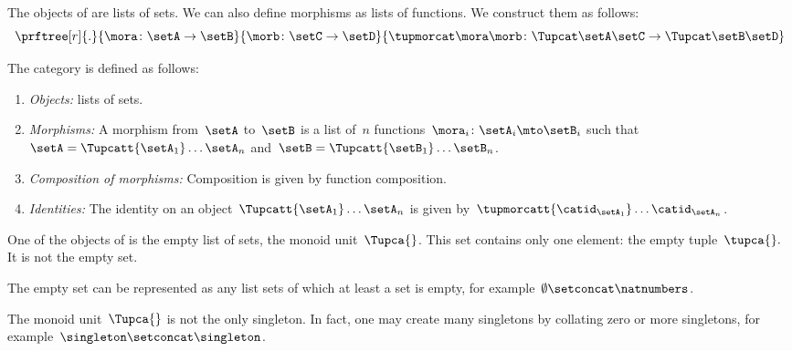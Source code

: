 The objects of \SetStar are lists of sets.
We can also define morphisms as lists of functions.
We construct them as follows:
%
\begin{equation}
    \label{eq:sets-monoid-maps2}
    \prftree[r]{.}{ 
        \mora \colon \setA \to \setB
    }{ 
        \morb \colon \setC \to \setD
    }{ 
        \tupmorcat \mora \morb \colon \Tupcat \setA   \setC \to \Tupcat \setB  \setD
    }
\end{equation}
%
\begin{definition}
    The category \SetStar is defined as follows: 
    \begin{enumerate}
        \item \emph{Objects:} lists of sets.
        \item \emph{Morphisms:} A morphism from~$\setA$ to~$\setB$ is a list of~$n$ functions~$\mora_i\colon \setA_i \mto \setB_i$ such that~$\setA = \Tupcatt {\setA_1}  \dots {\setA_n}$ and~$\setB = \Tupcatt {\setB_1} \dots {\setB_n}$.
        \item \emph{Composition of morphisms:} Composition is given by function composition.
        \item \emph{Identities:} The identity on an object~$\Tupcatt {\setA_1} \dots {\setA_n}$ is given by~$\tupmorcatt {\catid_{\setA_1}} \dots  {\catid_{\setA_n}} $.
    \end{enumerate}
\end{definition}


One of the objects of \SetStar is the empty list of sets, the monoid unit~$\Tupca{ }$.
This set contains only one element: the empty tuple~$\tupca{ }.$
It is not the empty set.

The empty set can be represented as any list sets of which at least a set is empty, for example~$\emptyset \setconcat \natnumbers$.

The monoid unit~$\Tupca{ }$ is not the only singleton. 
In fact, one may create many singletons by collating zero or more singletons, for example~$\singleton \setconcat \singleton$.


%

\showslides{
    \begin{forslides}
        
        \begin{equation}
            \tupca \ela   = \ela
        \end{equation}
        ~
        \begin{equation}
            \label{eq:sets-monoid-el-cat}
            \tupcat \ela \elb \elconcat \elc = \tupcatt \ela \elb \elc
        \end{equation}
    \end{forslides}
}
